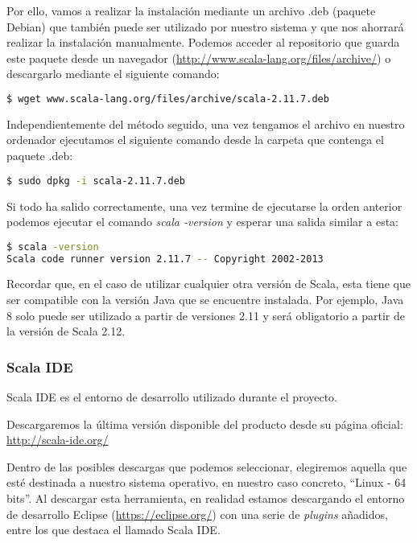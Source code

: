 Por ello, vamos a realizar la instalación mediante un archivo .deb (paquete Debian) que también puede ser utilizado por nuestro sistema y que nos ahorrará realizar la instalación manualmente. Podemos acceder al repositorio que guarda este paquete desde un navegador (\url{http://www.scala-lang.org/files/archive/}) o descargarlo mediante el siguiente comando:

\begin{lstlisting}[language=bash]
$ wget www.scala-lang.org/files/archive/scala-2.11.7.deb
\end{lstlisting}

Independientemente del método seguido, una vez tengamos el archivo en nuestro ordenador ejecutamos el siguiente comando desde la carpeta que contenga el paquete .deb:

\begin{lstlisting}[language=bash]
$ sudo dpkg -i scala-2.11.7.deb
\end{lstlisting}

Si todo ha salido correctamente, una vez termine de ejecutarse la orden anterior podemos ejecutar el comando \textit{scala -version} y esperar una salida similar a esta:

\begin{lstlisting}[language=bash]
$ scala -version
Scala code runner version 2.11.7 -- Copyright 2002-2013
\end{lstlisting}

Recordar que, en el caso de utilizar cualquier otra versión de Scala, esta tiene que ser compatible con la versión Java que se encuentre instalada. Por ejemplo, Java 8 solo puede ser utilizado a partir de versiones 2.11 y será obligatorio a partir de la versión de Scala 2.12. \cite{Scala2.12Roadmap}

\subsubsection{Scala IDE}

Scala IDE es el entorno de desarrollo utilizado durante el proyecto.

Descargaremos la  última versión disponible del producto desde su página oficial: \url{http://scala-ide.org/}

Dentro de las posibles descargas que podemos seleccionar, elegiremos aquella que esté destinada a nuestro sistema operativo, en nuestro caso concreto, ``Linux - 64 bits''. Al descargar esta herramienta, en realidad estamos descargando el entorno de desarrollo Eclipse (\url{https://eclipse.org/}) con una serie de \textit{plugins} añadidos, entre los que destaca el llamado Scala IDE.

